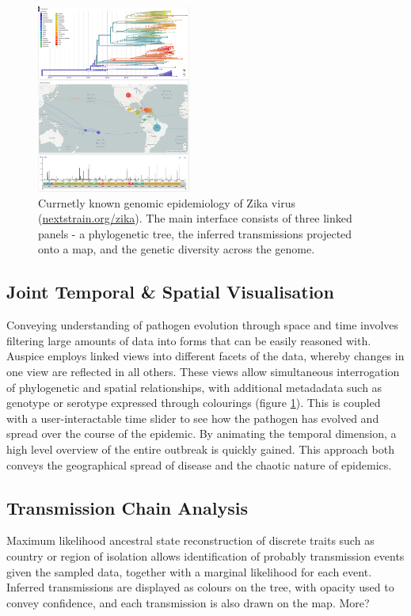 \documentclass{bioinfo}
\begin{document}
\begin{figure}[!tpb]
\centerline{\includegraphics[width=0.45\textwidth]{figures/nextstrain}}
\caption{Currnetly known genomic epidemiology of Zika virus (\href{nextstrain.org/zika}{nextstrain.org/zika}). The main interface consists of three linked panels - a phylogenetic tree, the inferred transmissions projected onto a map, and the genetic diversity across the genome.}
\label{nextstrain}
\end{figure}

\subsection*{Joint Temporal \& Spatial Visualisation}
Conveying understanding of pathogen evolution through space and time involves filtering large amounts of data into forms that can be easily reasoned with.
Auspice employs linked views into different facets of the data, whereby changes in one view are reflected in all others.
These views allow simultaneous interrogation of phylogenetic and spatial relationships, with additional metadadata such as genotype or serotype expressed through colourings (figure \ref{nextstrain}).
This is coupled with a user-interactable time slider to see how the pathogen has evolved and spread over the course of the epidemic.
By animating the temporal dimension, a high level overview of the entire outbreak is quickly gained.
This approach both conveys the geographical spread of disease and the chaotic nature of epidemics. 


\subsection*{Transmission Chain Analysis}
Maximum likelihood ancestral state reconstruction of discrete traits such as country or region of isolation allows identification of probably transmission events given the sampled data, together with a marginal likelihood for each event. 
Inferred transmissions are displayed as colours on the tree, with opacity used to convey confidence, and each transmission is also drawn on the map. 
More?
\end{document}
